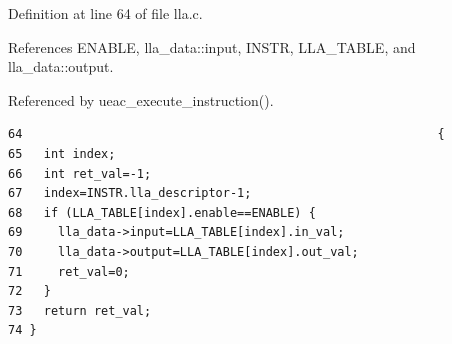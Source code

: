Definition at line 64 of file lla.c.

References ENABLE, lla\_\-data::input, INSTR, LLA\_\-TABLE, and lla\_\-data::output.

Referenced by ueac\_\-execute\_\-instruction().

\footnotesize\begin{verbatim}64                                                          {
65   int index;
66   int ret_val=-1;
67   index=INSTR.lla_descriptor-1;
68   if (LLA_TABLE[index].enable==ENABLE) {
69     lla_data->input=LLA_TABLE[index].in_val;
70     lla_data->output=LLA_TABLE[index].out_val;
71     ret_val=0;
72   }
73   return ret_val;
74 }
\end{verbatim}\normalsize 


